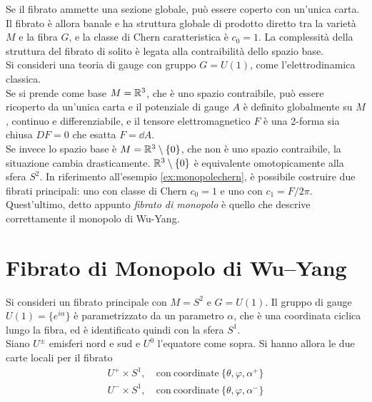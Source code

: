 Se il fibrato ammette una sezione globale, può essere coperto con un'unica carta.
Il fibrato è allora banale e ha struttura globale di prodotto diretto tra la
varietà $M$ e la fibra $G$, e la classe di Chern caratteristica è $c_0 = 1$.
La complessità della struttura del fibrato di solito è legata alla contraibilità
dello spazio base.\\

Si consideri una teoria di gauge con gruppo $G = U(1)$, come l'elettrodinamica classica.\\

Se si prende come base $M = \mathbb{R}^3$, che è uno spazio contraibile, può essere
ricoperto da un'unica carta e il potenziale di gauge $A$ è definito globalmente su $M$,
continuo e differenziabile, e il tensore elettromagnetico $F$ è una 2-forma
sia chiusa $DF = 0$ che esatta $F = \dd A$.\\

Se invece lo spazio base è $M = \mathbb{R}^3 \setminus \{0\}$, che non è uno spazio
contraibile, la situazione cambia drasticamente. $\mathbb{R}^3 \setminus \{0\}$ è
equivalente omotopicamente alla sfera $S^2$.
In riferimento all'esempio \ref{ex:monopolechern}, è possibile costruire due fibrati
principali: uno con classe di Chern $c_0 = 1$ e uno con $c_1 = F/2\pi$. Quest'ultimo,
detto appunto \emph{fibrato di monopolo} è quello che descrive correttamente il
monopolo di Wu-Yang.
\section{Fibrato di Monopolo di Wu–Yang}\label{sec:wuyangmonopole}
Si consideri un fibrato principale con $M = S^2$ e $G = U(1)$.
Il gruppo di gauge $U(1) = \{e^{i\alpha} \}$ è parametrizzato da un
parametro $\alpha$, che è una coordinata ciclica lungo la fibra, ed è identificato
quindi con la sfera $S^1$.\\

Siano $U^\pm$ emisferi nord e sud e $U^0$ l'equatore come sopra.
Si hanno allora le due carte locali per il fibrato
\begin{equation}
   \begin{aligned}
      U^+ \times S^1 ,&  \mathrm{\:con\: coordinate\:} \{ \theta, \varphi ,\alpha^+ \}\\
      U^- \times S^1 ,&  \mathrm{\:con\: coordinate\:} \{ \theta, \varphi ,\alpha^- \}
   \end{aligned}
\end{equation}

